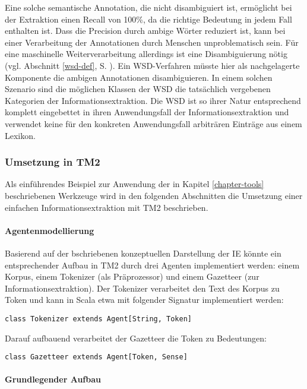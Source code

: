 \documentclass[abstracton, 12pt]{scrartcl}
\begin{document}
Eine solche semantische Annotation, die nicht disambiguiert ist, ermöglicht bei der Extraktion einen Recall von 100\%, da die richtige Bedeutung in jedem Fall enthalten ist. Dass die Precision durch ambige Wörter reduziert ist, kann bei einer Verarbeitung der Annotationen durch Menschen unproblematisch sein. Für eine maschinelle Weiterverarbeitung allerdings ist eine Disambiguierung nötig (vgl. Abschnitt \ref{wsd-def}, S. \pageref{wsd-def}). Ein WSD-Verfahren müsste hier als nachgelagerte Komponente die ambigen Annotationen disambiguieren. In einem solchen Szenario sind die möglichen Klassen der WSD die tatsächlich vergebenen Kategorien der Informationsextraktion. Die WSD ist so ihrer Natur entsprechend komplett eingebettet in ihren Anwendungsfall der Informationsextraktion und verwendet keine für den konkreten Anwendungsfall arbiträren Einträge aus einem Lexikon.

\subsubsection{Umsetzung in TM2} \label{tm2-ie}

Als einführendes Beispiel zur Anwendung der in Kapitel \ref{chapter-tools} beschriebenen Werkzeuge wird in den folgenden Abschnitten die Umsetzung einer einfachen Informationsextraktion mit TM2 beschrieben.

\paragraph{Agentenmodellierung}

Basierend auf der bschriebenen konzeptuellen Darstellung der IE könnte ein entsprechender Aufbau in TM2 durch drei Agenten implementiert werden: einem Korpus, einem Tokenizer (als Präprozessor) und einem Gazetteer (zur Informationsextraktion). Der Tokenizer verarbeitet den Text des Korpus zu Token und kann in Scala etwa mit folgender Signatur implementiert werden:

\begin{lstlisting}
class Tokenizer extends Agent[String, Token]
\end{lstlisting}

Darauf aufbauend verarbeitet der Gazetteer die Token zu Bedeutungen:

\begin{lstlisting}
class Gazetteer extends Agent[Token, Sense]
\end{lstlisting}

\paragraph{Grundlegender Aufbau}
\end{document}
